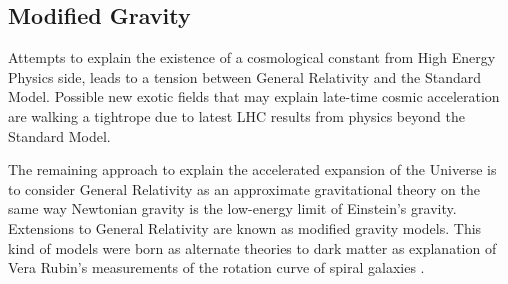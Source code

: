 \subsection{Modified Gravity}
Attempts to explain the existence of a cosmological constant from High Energy Physics side, leads to a tension between General Relativity and the Standard Model. Possible new exotic fields that may explain late-time cosmic acceleration are walking a tightrope due to latest LHC results from physics beyond the Standard Model.
\newline

The remaining approach to explain the accelerated expansion of the Universe is to consider General Relativity as an approximate gravitational theory on the same way Newtonian gravity is the low-energy limit of Einstein's gravity. Extensions to General Relativity are known as modified gravity models. This kind of models were born as alternate theories to dark matter as explanation of Vera Rubin's measurements of the rotation curve of spiral galaxies \cite{1982ApJ...253...70B,1983Sci...220.1339R,1985ApJ...289...81R,1985ApJ...297..423B}. 
\newline

